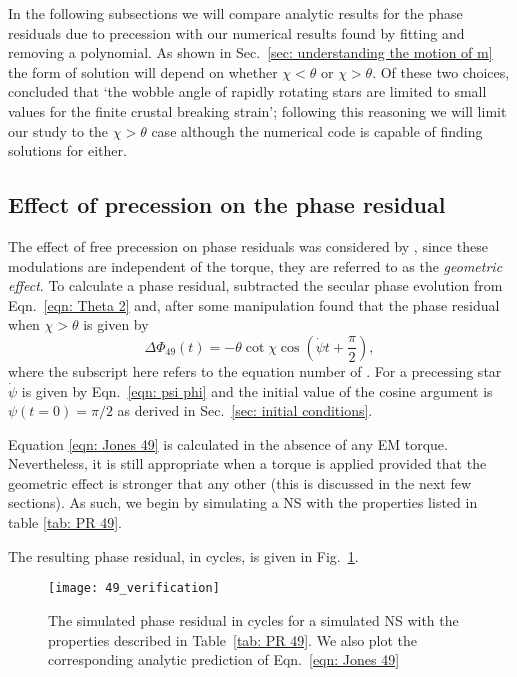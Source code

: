 \documentclass[../full_thesis/full_thesis.tex]{subfiles}
\begin{document}
In the following subsections we will compare analytic results for the phase
residuals due to precession with our numerical results found by fitting and
removing a polynomial. As shown in Sec.~\ref{sec: understanding the motion of m}
the form of solution will depend on whether $\chi < \theta$ or $\chi > \theta$.
Of these two choices, \citet{Jones2001} concluded that `the wobble angle of
rapidly rotating stars are limited to small values for the finite crustal
breaking strain'; following this reasoning we will limit our study to the
$\chi > \theta$ case although the numerical code is capable of finding solutions
for either.

\subsection{Effect of precession on the phase residual}

The effect of free precession on phase residuals was considered by \citet{Nelson1990},
since these modulations are independent of the torque, they are referred to as
the \emph{geometric effect}. To calculate a phase residual, \citet{Jones2001}
subtracted the secular phase evolution from Eqn.~\ref{eqn: Theta 2} and,
after some manipulation found that the phase residual when $\chi > \theta$ is
given by
\begin{equation}
    \Delta\Phi_{49}(t) = -\theta \cot\chi\cos\left(\dot{\psi}t + \frac{\pi}{2}\right),
    \label{eqn: Jones 49}
\end{equation}
where the subscript here refers to the equation number of \citet{Jones2001}.
For a precessing star $\dot{\psi}$ is given by Eqn.~\eqref{eqn: psi phi} and
the initial value of the cosine argument is $\psi(t=0)=\pi/2$ as derived in
Sec.~\ref{sec: initial conditions}.

Equation \eqref{eqn: Jones 49} is calculated in the absence of any EM torque.
Nevertheless, it is still appropriate when a torque is applied provided
that the geometric effect is stronger that any other (this is discussed in
the next few sections). As such, we begin by simulating a NS with the properties
listed in table \ref{tab: PR 49}.
\begin{table}
\centering

\caption{Simulation parameters used for the phase residual plotted in Fig.~\ref{fig: PR 49}}
\label{tab: PR 49}
\end{table}
The resulting phase residual, in cycles, is
given in Fig.~\ref{fig: PR 49}.
\begin{figure}[htb]
\centering
\texttt{[image: 49\_verification]}
\caption{The simulated phase residual in cycles for a simulated NS with the
properties described in Table~\ref{tab: PR 49}. We also plot the corresponding
analytic prediction of Eqn.~\eqref{eqn: Jones 49}}
\label{fig: PR 49}
\end{figure}
\end{document}
